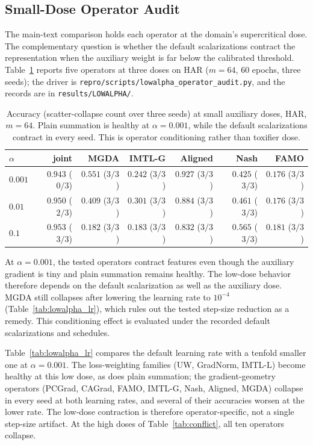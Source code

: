 \documentclass{article}
\begin{document}
\subsection{Small-Dose Operator Audit}\label{app:lowalpha}

The main-text comparison holds each operator at the domain's supercritical dose. The complementary question is whether the default scalarizations contract the representation when the auxiliary weight is far below the calibrated threshold. Table~\ref{tab:lowalpha} reports five operators at three doses on HAR ($m=64$, 60 epochs, three seeds); the driver is \texttt{repro/scripts/lowalpha\_operator\_audit.py}, and the records are in \texttt{results/LOWALPHA/}.

\begin{table}[h]
\centering
\caption{Accuracy (scatter-collapse count over three seeds) at small auxiliary doses, HAR, $m=64$. Plain summation is healthy at $\alpha=0.001$, while the default scalarizations contract in every seed. This is operator conditioning rather than toxifier dose.}
\label{tab:lowalpha}
\footnotesize
\begin{tabular}{lrrrrrr}
\toprule
$\alpha$ & joint & MGDA & IMTL-G & Aligned & Nash & FAMO \\
\midrule
$0.001$ & $0.943$ ($0/3$) & $0.551$ ($3/3$) & $0.242$ ($3/3$) & $0.927$ ($3/3$) & $0.425$ ($3/3$) & $0.176$ ($3/3$) \\
$0.01$ & $0.950$ ($2/3$) & $0.409$ ($3/3$) & $0.301$ ($3/3$) & $0.884$ ($3/3$) & $0.461$ ($3/3$) & $0.176$ ($3/3$) \\
$0.1$ & $0.953$ ($3/3$) & $0.182$ ($3/3$) & $0.183$ ($3/3$) & $0.832$ ($3/3$) & $0.565$ ($3/3$) & $0.181$ ($3/3$) \\
\bottomrule
\end{tabular}
\end{table}

At $\alpha=0.001$, the tested operators contract features even though the auxiliary gradient is tiny and plain summation remains healthy. The low-dose behavior therefore depends on the default scalarization as well as the auxiliary dose. MGDA still collapses after lowering the learning rate to $10^{-4}$ (Table~\ref{tab:lowalpha_lr}), which rules out the tested step-size reduction as a remedy. This conditioning effect is evaluated under the recorded default scalarizations and schedules.

Table~\ref{tab:lowalpha_lr} compares the default learning rate with a tenfold smaller one at $\alpha=0.001$. The loss-weighting families (UW, GradNorm, IMTL-L) become healthy at this low dose, as does plain summation; the gradient-geometry operators (PCGrad, CAGrad, FAMO, IMTL-G, Nash, Aligned, MGDA) collapse in every seed at both learning rates, and several of their accuracies worsen at the lower rate. The low-dose contraction is therefore operator-specific, not a single step-size artifact. At the high doses of Table~\ref{tab:conflict}, all ten operators collapse.
\end{document}
